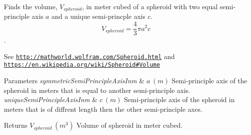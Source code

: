 Finds the volume, $V_{spheroid}$, in meter cubed of a spheroid with two equal semi-\/principle axis $a$ and a unique semi-\/princple axis $c$. \[ V_{spheroid}=\frac{4}{3}\pi a^2 c \]. 

See \href{http://mathworld.wolfram.com/Spheroid.html}{\tt http\+://mathworld.\+wolfram.\+com/\+Spheroid.\+html} and \href{https://en.wikipedia.org/wiki/Spheroid#Volume}{\tt https\+://en.\+wikipedia.\+org/wiki/\+Spheroid\#\+Volume}


\begin{DoxyParams}{Parameters}
{\em symmetric\+Semi\+Principle\+Axis\+Inm} & $ a\ (m)$ Semi-\/principle axis of the spheroid in meters that is equal to another semi-\/principle axis. \\
\hline
{\em unique\+Semi\+Principle\+Axis\+Inm} & $ c\ (m)$ Semi-\/principle axis of the spheroid in meters that is of diffrent length then the other semi-\/principle axes. \\
\hline
\end{DoxyParams}
\begin{DoxyReturn}{Returns}
$ V_{spheroid}\ (m^3)$ Volume of spheroid in meter cubed. 
\end{DoxyReturn}
